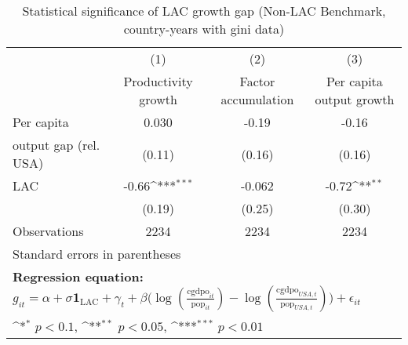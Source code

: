 \begin{table}[htbp]\centering
\def\sym#1{\ifmmode^{#1}\else\(^{#1}\)\fi}
\caption{Statistical significance of LAC growth gap (Non-LAC Benchmark, country-years with gini data)}
\begin{tabular}{l*{3}{c}}
\toprule
                &\multicolumn{1}{c}{(1)}&\multicolumn{1}{c}{(2)}&\multicolumn{1}{c}{(3)}\\
                &\multicolumn{1}{c}{Productivity growth}&\multicolumn{1}{c}{Factor accumulation}&\multicolumn{1}{c}{Per capita output growth}\\
\midrule
Per capita      &    0.030         &    -0.19         &    -0.16         \\
output gap (rel. USA)&   (0.11)         &   (0.16)         &   (0.16)         \\
\addlinespace
LAC             &    -0.66\sym{***}&   -0.062         &    -0.72\sym{**} \\
                &   (0.19)         &   (0.25)         &   (0.30)         \\
\midrule
Observations    &     2234         &     2234         &     2234         \\
\bottomrule
\multicolumn{4}{l}{\footnotesize Standard errors in parentheses}\\
\multicolumn{4}{l}{\footnotesize \textbf{Regression equation:} \(g_{it} = \alpha + \sigma \mathbf{1}_{\textrm{LAC}} + \gamma_t + \beta \big(\log (\frac{\textrm{cgdpo}_{it}}{\textrm{pop}_{it}} ) - \log (\frac{\textrm{cgdpo}_{USA,t}}{\textrm{pop}_{USA,t}}  ) \big) + \epsilon_{it}\)}\\
\multicolumn{4}{l}{\footnotesize \sym{*} \(p<0.1\), \sym{**} \(p<0.05\), \sym{***} \(p<0.01\)}\\
\end{tabular}
\end{table}
